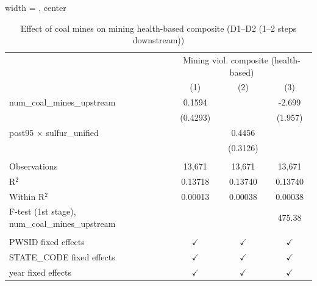 
\begin{table}[htbp]
   
   \caption{\label{2sls_4step_d1_d2_mining_healthbased} Effect of coal mines on mining health-based composite (D1--D2 (1--2 steps downstream))}
   \bigskip
   
   \centering
   
   \begin{adjustbox}{width = \textwidth, center}
      
      
      \begin{tabular}{lccc}
         \toprule
         
          & \multicolumn{3}{c}{Mining viol. composite (health-based)}\\
         
                                                           & (1)           & (2)           & (3)\\  
         
         \midrule 
         num\_coal\_mines\_upstream                        & 0.1594        &               & -2.699\\   
                                                           & (0.4293)      &               & (1.957)\\   
         post95 $\times$ sulfur\_unified                   &               & 0.4456        &   \\   
                                                           &               & (0.3126)      &   \\   
         
          \\
         
         Observations                                      & 13,671        & 13,671        & 13,671\\  
         R$^2$                                             & 0.13718       & 0.13740       & 0.13740\\  
         Within R$^2$                                      & 0.00013       & 0.00038       & 0.00038\\  
         F-test (1st stage), num\_coal\_mines\_upstream    &               &               & 475.38\\  
         
          \\
         
         PWSID fixed effects                               & $\checkmark$  & $\checkmark$  & $\checkmark$\\   
         STATE\_CODE fixed effects                         & $\checkmark$  & $\checkmark$  & $\checkmark$\\   
         year fixed effects                                & $\checkmark$  & $\checkmark$  & $\checkmark$\\   
         

\end{tabular}
\end{adjustbox}
\end{table}
